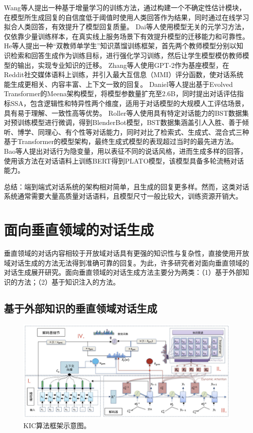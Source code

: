 Wang等人\cite{DBLP:conf/acl/WangZLHZL19}提出一种基于增量学习的训练方法，通过构建一个不确定性估计模块，在模型所生成回复的自信度低于阈值时使用人类回答作为结果，同时通过在线学习拟合人类回答，有效提升了模型回复质量。
Dai等人\cite{DBLP:conf/acl/DaiLTLSZ20}使用模型无关的元学习方法，仅依靠少量训练样本，在真实线上服务场景下有效提升模型的迁移能力和可靠性。
He等人\cite{DBLP:conf/emnlp/HeYYLSX20}提出一种“双教师单学生”知识蒸馏训练框架，首先两个教师模型分别以知识检索和回答生成作为训练目标，进行强化学习训练，然后让学生模型模仿教师模型的输出，实现专业知识的迁移。
Zhang等人\cite{DBLP:conf/acl/ZhangSGCBGGLD20}使用GPT-2\cite{radford2019language}作为基座模型，在Reddit社交媒体语料上训练，并引入最大互信息（MMI）评分函数，使对话系统能生成更相关、内容丰富、上下文一致的回复。
Daniel等人\cite{DBLP:journals/corr/abs-2001-09977}提出基于Evolved Transformer的Meena架构模型，将模型参数量扩充至2.6B，同时提出对话评估指标SSA，包含逻辑性和特异性两个维度，适用于对话模型的大规模人工评估场景，具有易于理解、一致性高等优势。
Roller等人\cite{DBLP:conf/eacl/RollerDGJWLXOSB21}使用具有特定对话能力的BST数据集对预训练模型进行微调，得到BlenderBot模型，BST数据集涵盖引人入胜、善于倾听、博学、同理心、有个性等对话能力，同时对比了检索式、生成式、混合式三种基于Transformer的模型架构，最终生成式模型的表现超过当时的最先进方法。
Bao等人\cite{DBLP:conf/acl/BaoHWWW20}提出对话行为隐变量，用以表征不同的说话风格，进而生成多样的回答，使用该方法在对话语料上训练BERT得到PLATO模型，该模型具备多轮流畅对话能力。

总结：端到端式对话系统的架构相对简单，且生成的回复更多样。然而，这类对话系统通常需要大量高质量对话语料，且模型尺寸一般比较大，训练资源开销大。

\section{面向垂直领域的对话生成}

垂直领域的对话内容相较于开放域对话具有更强的知识性与复杂性，直接使用开放域对话生成的方法无法得到准确可靠的回复。为此，许多研究者对面向垂直领域的对话生成展开研究。面向垂直领域的对话生成方法主要分为两类：（1）基于外部知识的方法；（2）基于知识注入的方法。

\subsection{基于外部知识的垂直领域对话生成}

\begin{figure}[htbp]
	\centering
	\includegraphics[scale=0.48]{Fig/KIC.png}
	\caption{\label{kic_architecture}KIC算法框架示意图\cite{DBLP:conf/acl/LinJHWC20}。}
\end{figure}

